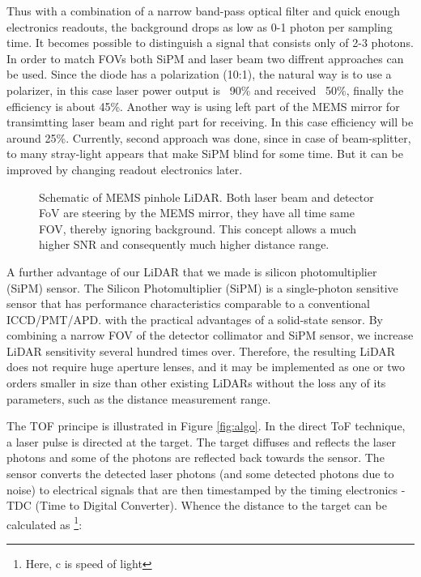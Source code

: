 Thus with a combination of a narrow band-pass optical filter and quick enough electronics readouts, the background drops as low as 0-1 photon per sampling time. It becomes possible to distinguish a signal that consists only of 2-3 photons.
In order to match FOVs both SiPM and laser beam two diffrent approaches can be used.
Since the diode has a polarization (10:1), the natural way is to use a polarizer, in this case laser power output is ~90\% and received ~50\%, finally the efficiency is about 45\%.
Another way is using left part of the MEMS mirror for transimtting laser beam and right part for receiving. In this case efficiency will be around 25\%.
Currently, second approach was done, since in case of beam-splitter, to many stray-light appears that make SiPM blind for some time. But it can be improved by changing readout electronics later.


\begin{figure}[h]
\caption{
Schematic of MEMS pinhole LiDAR. Both laser beam and detector FoV are steering by the MEMS mirror, they have all time same FOV, thereby ignoring background. This concept allows a much higher SNR and consequently much higher distance range.
}
\label{fig:concept_2} 
\end{figure}


A further advantage of our LiDAR that we made is silicon photomultiplier (SiPM)
sensor. The Silicon Photomultiplier (SiPM) is a single-photon sensitive sensor that has performance characteristics comparable to a conventional ICCD/PMT/APD. with the practical advantages of a solid-state sensor.
By combining a narrow FOV of the detector collimator and SiPM sensor, we increase LiDAR sensitivity several hundred times over. Therefore, the resulting LiDAR does not require huge aperture lenses, and it may be implemented as one or two orders smaller in size than other existing LiDARs without the loss any of its parameters, such as the distance measurement range.

The TOF principe is illustrated in Figure \ref{fig:algo}. In the direct ToF technique, a laser pulse is directed
at the target. The target diffuses and reflects the laser photons and some of the photons are reflected back towards
the sensor. The sensor converts the detected laser photons (and some detected photons due to noise) to electrical
signals that are then timestamped by the timing electronics - TDC (Time to Digital Converter).
Whence the distance to the target can be calculated as \footnote{Here, c is speed of light}:


